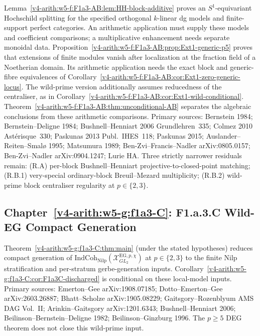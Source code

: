 Lemma~\ref{v4-arith:w5-f:F1a3-AB:lem:HH-block-additive}
proves an \(S^1\)-equivariant Hochschild splitting for the specified
orthogonal \(k\)-linear dg models and finite-support perfect categories.
An arithmetic application must supply these models and coefficient
comparisons; a multiplicative enhancement needs separate monoidal data.
Proposition~\ref{v4-arith:w5-f:F1a3-AB:prop:Ext1-generic-p5}
proves that extensions of finite modules vanish after localization
at the fraction field of a Noetherian domain. Its arithmetic
application needs the exact block and generic-fibre equivalences of
Corollary~\ref{v4-arith:w5-f:F1a3-AB:cor:Ext1-zero-generic-locus}.
The wild-prime version additionally assumes reducedness of the
centraliser, as in
Corollary~\ref{v4-arith:w5-f:F1a3-AB:cor:Ext1-wild-conditional}.
Theorem~\ref{v4-arith:w5-f:F1a3-AB:thm:unconditional-AB} separates
the algebraic conclusions from these arithmetic comparisons.
Primary sources: Bernstein 1984; Bernstein--Deligne 1984;
Bushnell--Henniart 2006 Grundlehren~335; Colmez 2010
Ast\'erisque~330; Paskunas 2013 Publ.~IHES~118; Paskunas 2015;
Auslander--Reiten--Smal\o{} 1995; Matsumura 1989;
Ben-Zvi--Francis--Nadler arXiv:0805.0157; Ben-Zvi--Nadler
arXiv:0904.1247; Lurie HA.
Three strictly narrower residuals remain: (R.A) per-block
Bushnell--Henniart projective-to-closed-point matching; (R.B.1)
very-special ordinary-block Breuil--Mezard multiplicity; (R.B.2)
wild-prime block centraliser regularity at \(p\in\{2,3\}\).

\subsection{Chapter~\ref{v4-arith:w5-g:f1a3-C}: F1.a.3.C Wild-EG Compact Generation}
\label{v4-arith:w5-synth:ch51}

Theorem~\ref{v4-arith:w5-g:f1a3-C:thm:main}
(under the stated hypotheses) reduces compact generation of
\(\mathrm{IndCoh}_{\mathrm{Nilp}}(\mathcal{X}^{\mathrm{EG},p,\chi}_{GL_{2}})\)
at \(p\in\{2,3\}\) to the finite Nilp stratification and per-stratum
gerbe-generation inputs.
Corollary~\ref{v4-arith:w5-g:f1a3-C:cor:F1a3C-discharged} is conditional on
these local-model inputs.
Primary sources: Emerton--Gee arXiv:1908.07185;
Dotto--Emerton--Gee arXiv:2603.26887; Bhatt--Scholze arXiv:1905.08229;
Gaitsgory--Rozenblyum AMS DAG Vol.~II; Arinkin--Gaitsgory
arXiv:1201.6343; Bushnell--Henniart 2006; Beilinson--Bernstein--Deligne
1982; Beilinson--Ginzburg 1996.
The \(p\geq5\) DEG theorem does not close this wild-prime input.

